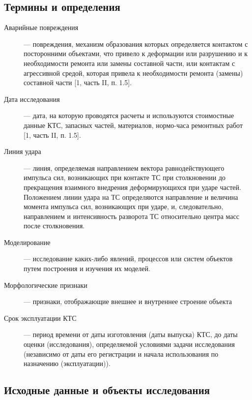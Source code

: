 \subsection{Термины и определения}
\begin{description}
	\item[Аварийные повреждения] --- повреждения, механизм образования которых определяется контактом с посторонними объектами, что привело к деформации или разрушению и к необходимости ремонта или замены составной части, или контактам с агрессивной средой, которая привела к необходимости ремонта (замены) составной части [1, часть II, п. 1.5].
	\item[Дата исследования]--- дата, на которую проводятся расчеты и используются стоимостные данные КТС, запасных частей, материалов, нормо-часа ремонтных работ [1, часть II, п. 1.5].
	\item[Линия удара]--- линия, определяемая направлением вектора равнодействующего импульса сил, возникающих при контакте ТС при столкновении до прекращения взаимного внедрения деформирующихся при ударе частей. Положением линии удара на ТС определяются направление и величина момента импульса сил, возникающих при ударе, и, следовательно, направлением и интенсивность разворота ТС относительно центра масс после столкновения.  
	\item[Моделирование]--- исследование каких-либо явлений, процессов или систем объектов путем построения и изучения их моделей.
	\item[Морфологические признаки]--- признаки, отображающие внешнее и внутреннее строение объекта
	\item[Срок эксплуатации КТС]--- период времени от даты изготовления (даты выпуска) КТС, до даты оценки (исследования), определяемой условиями задачи исследования (независимо от даты его регистрации и начала использования по назначению (эксплуатации)).
\end{description}
\subsection{Исходные данные и объекты исследования}

